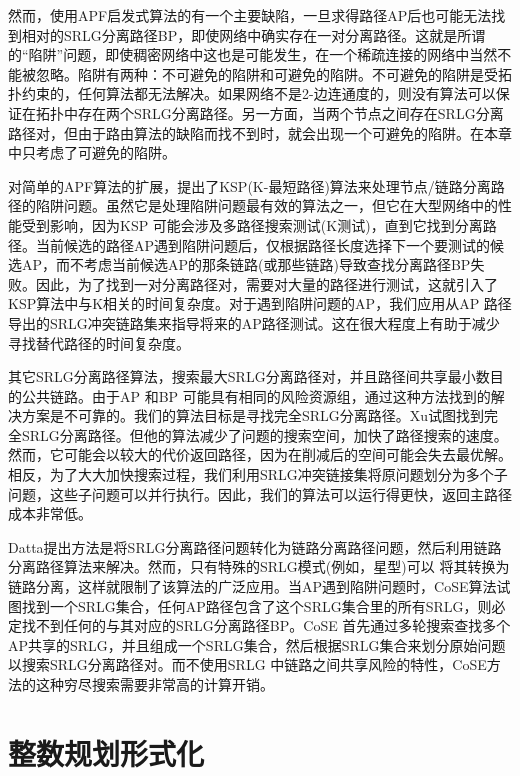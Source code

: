 然而，使用APF启发式算法的有一个主要缺陷，一旦求得路径AP后也可能无法找到相对的SRLG分离路径BP，即使网络中确实存在一对分离路径。这就是所谓的“陷阱”问题，即使稠密网络中\cite{laborczi2001solving}这也是可能发生，在一个稀疏连接的网络中当然不能被忽略。陷阱有两种：不可避免的陷阱和可避免的陷阱。不可避免的陷阱是受拓扑约束的，任何算法都无法解决。如果网络不是2-边连通度的，则没有算法可以保证在拓扑中存在两个SRLG分离路径。另一方面，当两个节点之间存在SRLG分离路径对，但由于路由算法的缺陷而找不到时，就会出现一个可避免的陷阱。在本章中只考虑了可避免的陷阱。

对简单的APF算法的扩展，提出了KSP(K-最短路径)算法来处理节点/链路分离路径的陷阱问题。虽然它是处理陷阱问题最有效的算法之一，但它在大型网络中的性能受到影响，因为KSP 可能会涉及多路径搜索测试(K测试)，直到它找到分离路径。当前候选的路径AP遇到陷阱问题后，仅根据路径长度选择下一个要测试的候选AP，而不考虑当前候选AP的那条链路(或那些链路)导致查找分离路径BP失败。因此，为了找到一对分离路径对，需要对大量的路径进行测试，这就引入了KSP算法中与K相关的时间复杂度。对于遇到陷阱问题的AP，我们应用从AP 路径导出的SRLG冲突链路集来指导将来的AP路径测试。这在很大程度上有助于减少寻找替代路径的时间复杂度。

其它SRLG分离路径算法\cite{rostami2012msdp,rostami2007cose,datta2008graph,xu2003new,todimala2004imsh}，搜索最大SRLG分离路径对，并且路径间共享最小数目的公共链路。由于AP 和BP 可能具有相同的风险资源组，通过这种方法找到的解决方案是不可靠的。我们的算法目标是寻找完全SRLG分离路径。Xu\cite{xu2003trap}试图找到完全SRLG分离路径。但他的算法减少了问题的搜索空间，加快了路径搜索的速度。然而，它可能会以较大的代价返回路径，因为在削减后的空间可能会失去最优解。相反，为了大大加快搜索过程，我们利用SRLG冲突链接集将原问题划分为多个子问题，这些子问题可以并行执行。因此，我们的算法可以运行得更快，返回主路径成本非常低。

Datta\cite{datta2008graph}提出方法是将SRLG分离路径问题转化为链路分离路径问题，然后利用链路分离路径算法来解决。然而，只有特殊的SRLG模式(例如，星型)可以
将其转换为链路分离，这样就限制了该算法的广泛应用。当AP遇到陷阱问题时，CoSE\cite{rostami2007cose}算法试图找到一个SRLG集合，任何AP路径包含了这个SRLG集合里的所有SRLG，则必定找不到任何的与其对应的SRLG分离路径BP。CoSE 首先通过多轮搜索查找多个AP共享的SRLG，并且组成一个SRLG集合，然后根据SRLG集合来划分原始问题以搜索SRLG分离路径对。而不使用SRLG 中链路之间共享风险的特性，CoSE方法的这种穷尽搜索需要非常高的计算开销。



\section{整数规划形式化}
